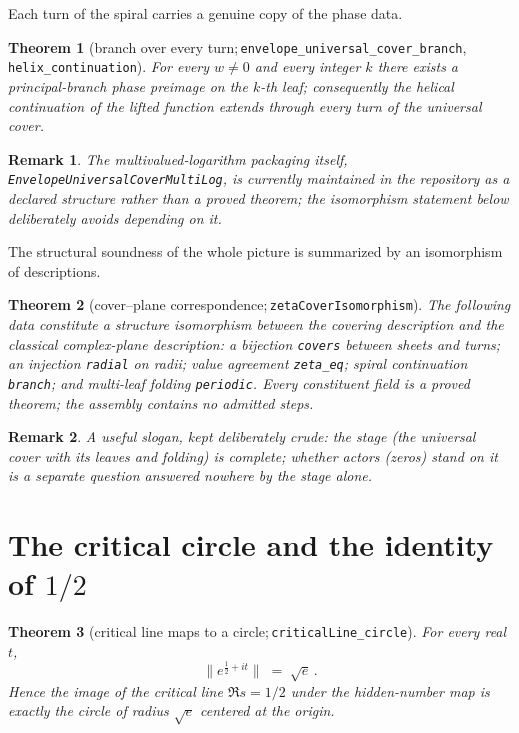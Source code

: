 \documentclass[submission]{jsfds}
\newtheorem{theorem}{Theorem}
\newtheorem*{remark}{Remark}
\newcommand{\Lean}[1]{\texttt{#1}}
\newcommand{\Norm}[1]{\lVert #1\rVert}
\begin{document}
Each turn of the spiral carries a genuine copy of the phase data.

\begin{theorem}[branch over every turn;\,\Lean{envelope_universal_cover_branch},
\Lean{helix_continuation}]\label{thm:branches}
For every $w\neq 0$ and every integer $k$ there exists a principal-branch phase
preimage on the $k$-th leaf; consequently the helical continuation of the
lifted function extends through every turn of the universal cover.
\end{theorem}

\begin{remark}
The multivalued-logarithm packaging itself,
\Lean{EnvelopeUniversalCoverMultiLog}, is currently maintained in the repository
as a declared structure rather than a proved theorem; the isomorphism statement
below deliberately avoids depending on it.
\end{remark}

The structural soundness of the whole picture is summarized by an isomorphism
of descriptions.

\begin{theorem}[cover--plane correspondence;\,\Lean{zetaCoverIsomorphism}]
\label{thm:coveriso}
The following data constitute a structure isomorphism between the covering
description and the classical complex-plane description: a bijection
\Lean{covers} between sheets and turns; an injection \Lean{radial} on radii;
value agreement \Lean{zeta_eq}; spiral continuation \Lean{branch}; and
multi-leaf folding \Lean{periodic}. Every constituent field is a proved
theorem; the assembly contains no admitted steps.
\end{theorem}

\begin{remark}
A useful slogan, kept deliberately crude: the stage (the universal cover with
its leaves and folding) is complete; whether actors (zeros) stand on it is a
separate question answered nowhere by the stage alone.
\end{remark}

\section{The critical circle and the identity of \texorpdfstring{$1/2$}{1/2}}
\label{sec:criticalcircle}

\begin{theorem}[critical line maps to a circle;\,\Lean{criticalLine_circle}]
\label{thm:critcircle}
For every real $t$,
\[
  \Norm{e^{\tfrac12+it}} \;=\; \sqrt{e}\, .
\]
Hence the image of the critical line $\Re s=1/2$ under the hidden-number map is
exactly the circle of radius $\sqrt{e}$ centered at the origin.
\end{theorem}
\end{document}
